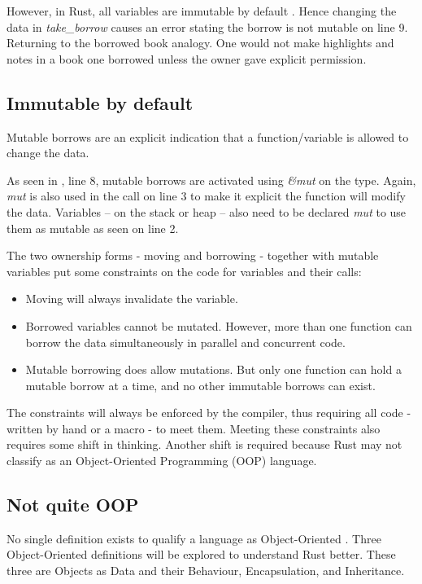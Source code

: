 However, in Rust, all variables are immutable by default \cite{klabnik_2019_01}.
Hence changing the data in \textit{take\_borrow} causes an error stating the borrow is not mutable on line 9.
Returning to the borrowed book analogy.
One would not make highlights and notes in a book one borrowed unless the owner gave explicit permission.

\subsection{Immutable by default}
Mutable borrows are an explicit indication that a function/variable is allowed to change the data.


As seen in , line 8, mutable borrows are activated using \textit{\&mut } on the type.
Again, \textit{mut} is also used in the call on line 3 to make it explicit the function will modify the data.
Variables -- on the stack or heap -- also need to be declared \textit{mut} to use them as mutable \cite{klabnik_2019_01} as seen on line 2.

The two ownership forms - moving and borrowing - together with mutable variables put some constraints on the code for variables and their calls: \cite{klabnik_2019_01}
\begin{itemize}
	\item Moving will always invalidate the variable.
	\item Borrowed variables cannot be mutated.
	      However, more than one function can borrow the data simultaneously in parallel and concurrent code.
	\item Mutable borrowing does allow mutations.
	      But only one function can hold a mutable borrow at a time, and no other immutable borrows can exist.
\end{itemize}

The constraints will always be enforced by the compiler, thus requiring all code - written by hand or a macro - to meet them.
Meeting these constraints also requires some shift in thinking.
Another shift is required because Rust may not classify as an Object-Oriented Programming (OOP) language.

\subsection{Not quite OOP}
No single definition exists to qualify a language as Object-Oriented \cite{meyer_97_01,stefik_85_01,gamma_94_01,klabnik_2019_01}.
Three Object-Oriented definitions will be explored to understand Rust better.
These three are Objects as Data and their Behaviour, Encapsulation, and Inheritance.


